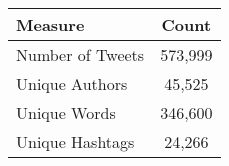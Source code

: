 %
    
    \centering
    \begin{tabular}{lc}
        \toprule\toprule
            Measure & Count \\ \hline
            Number of Tweets & 573,999 \\ 
            Unique Authors & 45,525 \\ 
            Unique Words & 346,600 \\ 
            Unique Hashtags & 24,266 \\ 
        \bottomrule\bottomrule
    \end{tabular}

%